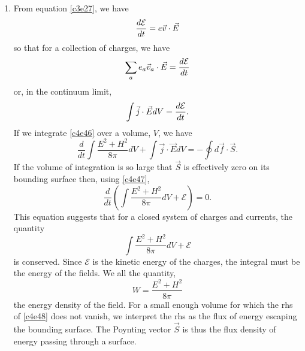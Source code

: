 \begin{enumerate}
\item From equation \eqref{c3e27}, we have
\[
\frac{d{\mathcal{E}}}{d{t}} = e\vec{v}\cdot\vec{E}
\]
so that for a collection of charges, we have
\[
\sum_a e_a\vec{v}_a\cdot\vec{E} = \frac{d{\mathcal{E}}}{d{t}}
\]
or, in the continuum limit,
\begin{equation}\label{c4e47}
\int\vec{j}\cdot\vec{E}dV = \frac{d{\mathcal{E}}}{d{t}}.
\end{equation}
If we integrate \eqref{c4e46} over a volume, $V$, we have
\begin{equation}\label{c4e48}
\frac{d}{dt}\int\frac{E^2 + H^2}{8\pi}dV + 
\int \vec{j}\cdot\vec{E}dV = -\oint d\vec{f}\cdot\vec{S}.
\end{equation}
If the volume of integration is so large that $\vec{S}$ is effectively zero on
its bounding surface then, using \eqref{c4e47},
\begin{equation}\label{c4e49}
\frac{d}{dt}\left(\int\frac{E^2 + H^2}{8\pi}dV + \mathcal{E}\right) = 0.
\end{equation}
This equation suggests that for a closed system of charges and currents,
the quantity
\[
\int\frac{E^2 + H^2}{8\pi}dV + \mathcal{E}
\]
is conserved. Since $\mathcal{E}$ is the kinetic energy of the charges,
the integral must be the energy of the fields. We all the quantity,
\begin{equation}\label{c4e50}
W = \frac{E^2 + H^2}{8\pi}
\end{equation}
the energy density of the field. For a small enough volume for which the rhs of
\eqref{c4e48} does not vanish, we interpret the rhs as the flux of energy escaping
the bounding surface. The Poynting vector $\vec{S}$ is thus the flux density of
energy passing through a surface.


\end{enumerate}
